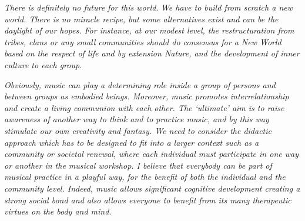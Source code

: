 \documentclass{article}
\begin{document}
\textsl{There is definitely no future for this world}. \textsl{We have to build from scratch a new world. There is no miracle recipe, but some alternatives exist} \textsl{and can be the daylight of our hopes. 
For instance, at our modest level, the restructuration from tribes, clans or any small communities should do consensus for a New World based on the respect of life and by extension Nature, and the development of inner culture to each group}. 

\textsl{Obviously, music can play a determining role inside a group of persons and between groups as embodied beings.
Moreover, music promotes interrelationship and create a living communion with each other.
The `ultimate' aim is to raise awareness of another way to think and to practice music, and by this way stimulate our own creativity and fantasy.
We need to consider the didactic approach which has to be designed to fit into a larger context such as a community or societal renewal, where each individual must participate in one way or another in the musical workshop. 
I believe that everybody can be part of musical practice in a playful way, for the benefit of  both the individual and the community level.
%  
Indeed, music allows significant cognitive development creating a strong social bond and also allows everyone to benefit from its many
therapeutic virtues on the body and mind}.
\end{document}
